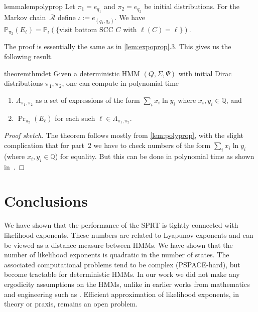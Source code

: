\documentclass[a4paper,UKenglish,cleveref, autoref,mathscr]{lipics-v2019}
\newcommand{\QQ}{\mathbb{Q}}
\newcommand{\PP}{\mathbb{P}}
\newcommand{\1}{\mathbbm{1}}
\newcommand{\A}{\mathcal{A}}
\newcommand{\oA}{\bar{\A}}
\begin{document}
\begin{restatable}{lemma}{lempolyprop} \label{lem:polyprop}
Let $\pi_1 = e_{q_1}$ and $\pi_2 = e_{q_2}$ be initial distributions.
For the Markov chain~$\oA$ define $\iota := e_{(q_1,q_2)}$.
We have
$\PP_{\pi_2}(E_\ell) = \PP_{\iota}(\{\text{visit bottom SCC $C$ with $\ell(C) = \ell$}\})$.
\end{restatable}
The proof is essentially the same as in \cref{lem:expoprop}.3.
This gives us the following result.
\begin{restatable}{theorem}{thmdet} \label{thm:det}
Given a deterministic HMM $(Q, \Sigma, \Psi)$ with initial Dirac distributions $\pi_1, \pi_2$, one can compute in polynomial time
\begin{enumerate}
\item $\Lambda_{\pi_1,\pi_2}$ as a set of expressions of the form $\sum_i x_i \ln y_i$ where $x_i,y_i \in \QQ$, and
\item $\Pr_{\pi_2}(E_\ell)$ for each such $\ell \in \Lambda_{\pi_1,\pi_2}$.
\end{enumerate}
\end{restatable}
\begin{proof}[Proof sketch]
The theorem follows mostly from \cref{lem:polyprop}, with the slight complication that for part~2 we have to check numbers of the form $\sum_i x_i \ln y_i$ (where $x_i,y_i \in \QQ$) for equality.
But this can be done in polynomial time as shown in~\cite{EtessamiSY14}.
\end{proof}

\section{Conclusions} \label{sec:conclusions}
We have shown that the performance of the SPRT is tightly connected with likelihood exponents.
These numbers are related to Lyapunov exponents and can be viewed as a distance measure between HMMs.
We have shown that the number of likelihood exponents is quadratic in the number of states.
The associated computational problems tend to be complex (PSPACE-hard), but become tractable for deterministic HMMs.
In our work we did not make any ergodicity assumptions on the HMMs, unlike in earlier works from mathematics and engineering such as \cite{JuangRabiner85,ChenWillett00,Fuh03,GrossiLops08}.
Efficient approximation of likelihood exponents, in theory or praxis, remains an open problem.
\end{document}
